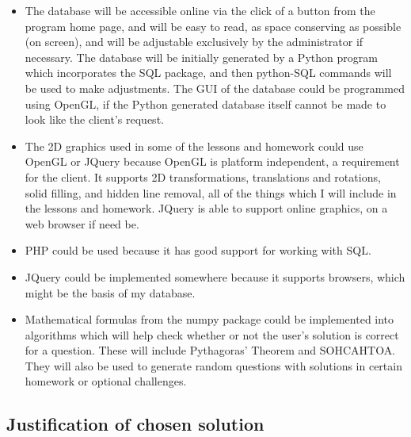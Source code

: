 \begin{itemize}
	\item The database will be accessible online via the click of a button from the program home page, and will be easy to read, as space conserving as possible (on screen), and will be adjustable exclusively by the administrator if necessary. The database will be initially generated by a Python program which incorporates the SQL package, and then python-SQL commands will be used to make adjustments. The GUI of the database could be programmed using OpenGL, if the Python generated database itself cannot be made to look like the client's request.

	\item The 2D graphics used in some of the lessons and homework could use OpenGL or JQuery because OpenGL is platform independent, a requirement for the client. It supports 2D transformations, translations and rotations, solid filling, and hidden line removal, all of the things which I will include in the lessons and homework. JQuery is able to support online graphics, on a web browser if need be.

	\item PHP could be used because it has good support for working with SQL.

	\item JQuery could be implemented somewhere because it supports browsers, which might be the basis of my database.

	\item Mathematical formulas from the numpy package could be implemented into algorithms which will help check whether or not the user's solution is correct for a question. These will include Pythagoras' Theorem and SOHCAHTOA. They will also be used to generate random questions with solutions in certain homework or optional challenges.

\end{itemize}

\subsection{Justification of chosen solution}

